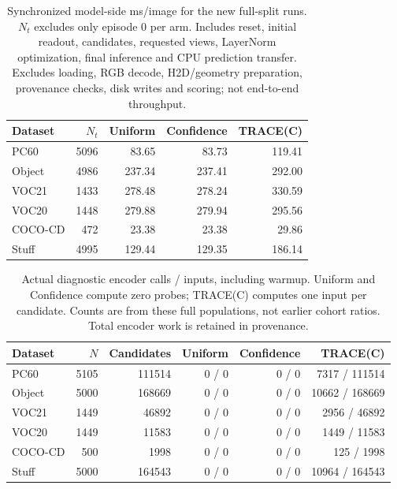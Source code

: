\begin{table}[t]
\caption{Synchronized model-side ms/image for the new full-split runs. $N_t$ excludes only episode 0 per arm. Includes reset, initial readout, candidates, requested views, LayerNorm optimization, final inference and CPU prediction transfer. Excludes loading, RGB decode, H2D/geometry preparation, provenance checks, disk writes and scoring; not end-to-end throughput.}
\label{tab:image-full-cost}
\centering\small
\begin{tabular}{@{}lrrrr@{}}
\toprule
Dataset & $N_t$ & Uniform & Confidence & TRACE(C) \\
\midrule
PC60 & 5096 & 83.65 & 83.73 & 119.41 \\
Object & 4986 & 237.34 & 237.41 & 292.00 \\
VOC21 & 1433 & 278.48 & 278.24 & 330.59 \\
VOC20 & 1448 & 279.88 & 279.94 & 295.56 \\
COCO-CD & 472 & 23.38 & 23.38 & 29.86 \\
Stuff & 4995 & 129.44 & 129.35 & 186.14 \\
\bottomrule
\end{tabular}
\end{table}
\begin{table}[t]
\caption{Actual diagnostic encoder calls / inputs, including warmup. Uniform and Confidence compute zero probes; TRACE(C) computes one input per candidate. Counts are from these full populations, not earlier cohort ratios. Total encoder work is retained in provenance.}
\label{tab:image-full-work}
\centering\small
\begin{tabular}{@{}lrrrrr@{}}
\toprule
Dataset & $N$ & Candidates & Uniform & Confidence & TRACE(C) \\
\midrule
PC60 & 5105 & 111514 & 0 / 0 & 0 / 0 & 7317 / 111514 \\
Object & 5000 & 168669 & 0 / 0 & 0 / 0 & 10662 / 168669 \\
VOC21 & 1449 & 46892 & 0 / 0 & 0 / 0 & 2956 / 46892 \\
VOC20 & 1449 & 11583 & 0 / 0 & 0 / 0 & 1449 / 11583 \\
COCO-CD & 500 & 1998 & 0 / 0 & 0 / 0 & 125 / 1998 \\
Stuff & 5000 & 164543 & 0 / 0 & 0 / 0 & 10964 / 164543 \\
\bottomrule
\end{tabular}
\end{table}
